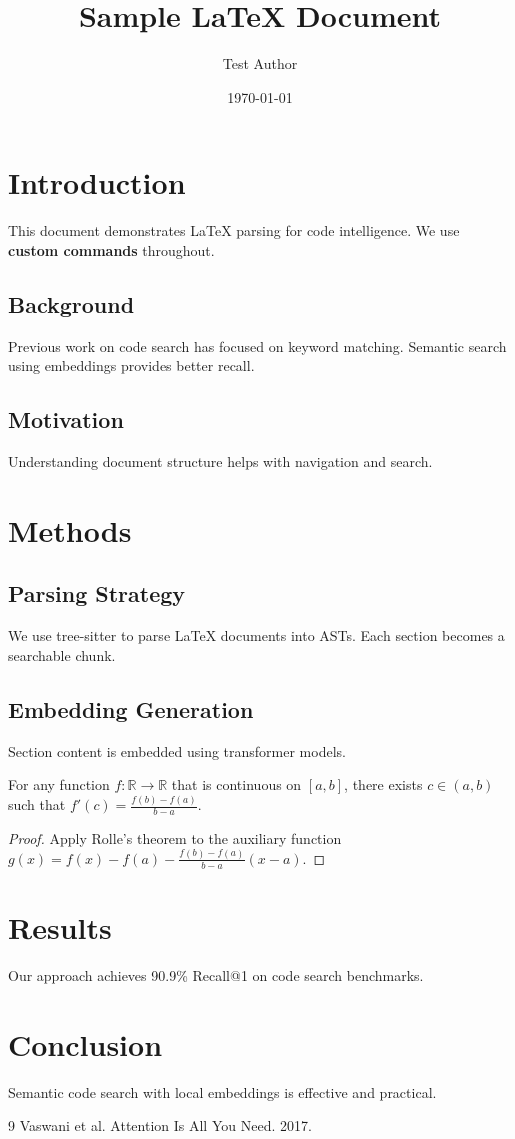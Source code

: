 \documentclass{article}
\title{Sample LaTeX Document}
\author{Test Author}
\date{\today}
\newcommand{\highlight}[1]{\textbf{#1}}
\newcommand{\R}{\mathbb{R}}
\begin{document}
\maketitle
\tableofcontents

\section{Introduction}
This document demonstrates LaTeX parsing for code intelligence.
We use \highlight{custom commands} throughout.

\subsection{Background}
Previous work on code search has focused on keyword matching.
Semantic search using embeddings provides better recall.

\subsection{Motivation}
Understanding document structure helps with navigation and search.

\section{Methods}

\subsection{Parsing Strategy}
We use tree-sitter to parse LaTeX documents into ASTs.
Each section becomes a searchable chunk.

\subsection{Embedding Generation}
Section content is embedded using transformer models.

\begin{theorem}
For any function $f: \R \to \R$ that is continuous on $[a,b]$,
there exists $c \in (a,b)$ such that $f'(c) = \frac{f(b)-f(a)}{b-a}$.
\end{theorem}

\begin{proof}
Apply Rolle's theorem to the auxiliary function
$g(x) = f(x) - f(a) - \frac{f(b)-f(a)}{b-a}(x-a)$.
\end{proof}

\section{Results}
Our approach achieves 90.9\% Recall@1 on code search benchmarks.

\section{Conclusion}
Semantic code search with local embeddings is effective and practical.

\begin{thebibliography}{9}
 Vaswani et al. Attention Is All You Need. 2017.
\end{thebibliography}
\end{document}
